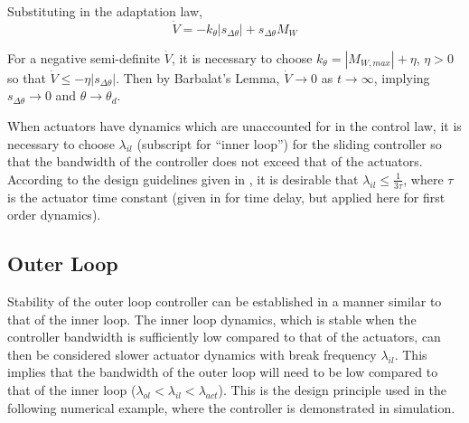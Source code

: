 \documentclass[letterpaper, 10 pt, conference]{ieeeconf}\usepackage[margin=1in]{geometry}
\begin{document}
Substituting in the adaptation law, 
\begin{equation}
	\dot V = - k_\theta |s_{\Delta \theta}| + s_{\Delta \theta} M_W
\end{equation}

For a negative semi-definite $\dot V$, it is necessary to choose $k_\theta = |M_{W,max}| + \eta$, $\eta > 0$ so that $\dot{V} \leq -\eta |s_{\Delta \theta}|$. Then by Barbalat's Lemma, $\dot{V} \rightarrow 0$ as $t \rightarrow \infty$, implying $s_{\Delta \theta} \rightarrow 0$ and $\theta \rightarrow \theta_d$. 

When actuators have dynamics which are unaccounted for in the control law, it is necessary to choose $\lambda_{il}$ (subscript for ``inner loop'') for the sliding controller so that the bandwidth of the controller does not exceed that of the actuators. According to the design guidelines given in \cite{slotine1991applied}, it is desirable that $\lambda_{il} \leq \frac{1}{3 \tau}$, where $\tau$ is the actuator time constant (given in \cite{slotine1991applied} for time delay, but applied here for first order dynamics).

\subsection{Outer Loop}
Stability of the outer loop controller can be established in a manner similar to that of the inner loop. The inner loop dynamics, which is stable when the controller bandwidth is sufficiently low compared to that of the actuators, can then be considered slower actuator dynamics with break frequency $\lambda_{il}$. This implies that the bandwidth of the outer loop will need to be low compared to that of the inner loop ($\lambda_{ol} < \lambda_{il} < \lambda_{act}$). This is the design principle used in the following numerical example, where the controller is demonstrated in simulation. 
\end{document}
